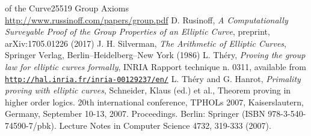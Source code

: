 \documentclass[12pt]{amsart}
\theoremstyle{plain}
\theoremstyle{remark}
\theoremstyle{definition}
\begin{document}
\begin{thebibliography}{10}
{of the Curve25519 Group Axioms}\\
\url{http://www.russinoff.com/papers/group.pdf}
D. Rusinoff, {\em A Computationally Surveyable Proof of the Group Properties of an Elliptic Curve}, preprint, arXiv:1705.01226 (2017)
 J. H. Silverman,
  {\it The Arithmetic of Elliptic Curves},
  Springer Verlag, Berlin--Heidelberg--New York (1986)
L. Th\'ery, {\em Proving the group law for elliptic curves formally},
INRIA Rapport technique n. 0311, available from\\
\texttt{\url{http://hal.inria.fr/inria-00129237/en/}}
L. Th\'ery and G. Hanrot, {\em 
Primality proving with elliptic curves},
Schneider, Klaus (ed.) et al., Theorem proving in higher order logics. 20th international conference, TPHOLs 2007, Kaiserslautern, Germany, September 10-13, 2007. Proceedings. Berlin: Springer (ISBN 978-3-540-74590-7/pbk). Lecture Notes in Computer Science 4732, 319-333 (2007).

\end{thebibliography}
\end{document}
